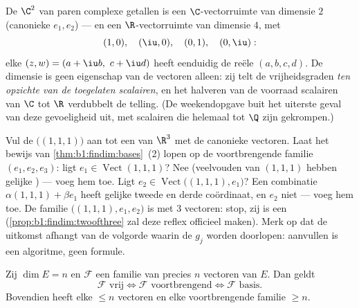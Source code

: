 \begin{example}
\label{ex:b1:findim:twodimensions}
De  $\C^2$ van paren complexe getallen is een
$\C$-vectorruimte van dimensie $2$ (canonieke  $e_1, e_2$)
--- en een $\R$-vectorruimte van dimensie $4$, met 
\[
(1, 0),\quad (\iu, 0),\quad (0, 1),\quad (0, \iu):
\]
elke $(z, w) = (a + \iu b,\ c + \iu d)$ heeft eenduidig de reële
 $(a, b, c, d)$. De dimensie is geen eigenschap van de
 vectoren alleen: zij telt de vrijheidsgraden
\emph{ten opzichte van de toegelaten scalairen}, en het halveren
van de voorraad scalairen van $\C$ tot $\R$ verdubbelt de telling.
(De weekendopgave buit het uiterste geval van deze gevoeligheid
uit, met scalairen die helemaal tot $\Q$ zijn gekrompen.)
\end{example}

\begin{example}
\label{ex:b1:findim:completion}
Vul de  $\bigl((1,1,1)\bigr)$ aan tot een  van
$\R^3$ met de canonieke vectoren. Laat het bewijs van
\cref{thm:b1:findim:bases}~(2) lopen op de voortbrengende familie
$(e_1, e_2, e_3)$: ligt $e_1 \in \operatorname{Vect}(1,1,1)$? Nee
(veelvouden van $(1,1,1)$ hebben gelijke ) --- voeg hem
toe. Ligt $e_2 \in \operatorname{Vect}\bigl((1,1,1), e_1\bigr)$?
Een combinatie $\alpha(1,1,1) + \beta e_1$ heeft gelijke tweede en
derde coördinaat, en $e_2$ niet --- voeg hem toe. De familie
$\bigl((1,1,1), e_1, e_2\bigr)$ is  met $3$ vectoren: stop, zij
is een  (\cref{prop:b1:findim:twoofthree} zal deze reflex
officieel maken). Merk op dat de uitkomst afhangt van de volgorde
waarin de $g_j$ worden doorlopen: aanvullen is een algoritme, geen
formule.
\end{example}

\begin{proposition}\label{prop:b1:findim:twoofthree}
Zij $\dim E = n$ en $\mathcal{F}$ een familie van precies $n$
vectoren van $E$. Dan geldt
\[
\mathcal{F} \text{ vrij} \iff \mathcal{F} \text{ voortbrengend}
\iff \mathcal{F} \text{ basis}.
\]
Bovendien heeft elke  $\leq n$ vectoren en elke
voortbrengende familie $\geq n$.
\end{proposition}

